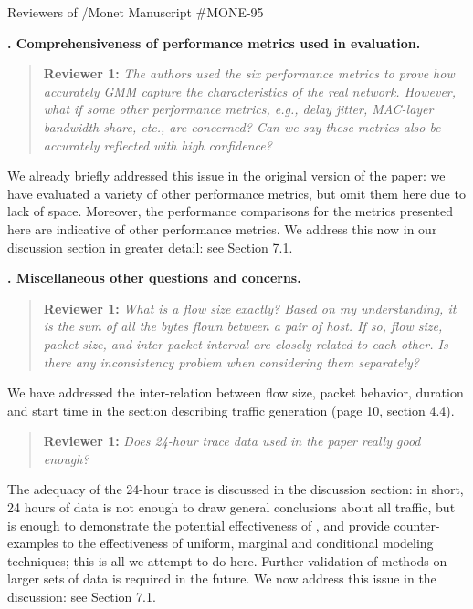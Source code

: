 \documentclass{letter}
\newcounter{topic}
\newcommand{\topic}[1]{
\addtocounter{topic}{1}
\textbf{\arabic{topic}. #1}
}
\newenvironment{reviewer}[1]%
{\begin{quote}\textbf{Reviewer #1:} \it}{\end{quote}}
\begin{document}
\begin{letter}{Reviewers of /Monet Manuscript \#MONE-95}
\topic{Comprehensiveness of performance metrics used in evaluation.}

\begin{reviewer}{1}
The authors used the six performance metrics to prove how accurately GMM capture the characteristics of the real network. However, what if some other performance metrics, e.g., delay jitter, MAC-layer bandwidth share, etc., are concerned? Can we say these metrics also be accurately reflected with high confidence?
\end{reviewer}

We already briefly addressed this issue in the original version of the paper:
we have evaluated a variety of other performance metrics, but omit them here due to lack of space.
Moreover, the performance comparisons for the metrics presented here are indicative of other performance metrics.
We address this now in our discussion section in greater detail: see Section 7.1.

\topic{Miscellaneous other questions and concerns.}

\begin{reviewer}{1}
What is a flow size exactly? Based on my understanding, it is the sum of all the bytes ﬂown between a pair of host. If so, flow size, packet size, and inter-packet interval are closely related to each other. Is there any inconsistency problem when considering them separately?
\end{reviewer}
We have addressed the inter-relation between flow size, packet behavior, duration and start time in the section describing traffic generation (page 10, section 4.4).

\begin{reviewer}{1}
Does 24-hour trace data used in the paper really good enough?
\end{reviewer}
The adequacy of the 24-hour trace is discussed in the discussion section: in short, 24 hours of data is not enough to draw general conclusions about all traffic, but is enough to demonstrate the potential effectiveness of , and provide counter-examples to the effectiveness of uniform, marginal and conditional modeling techniques;
this is all we attempt to do here.
Further validation of methods on larger sets of data is required in the future.
We now address this issue in the discussion: see Section 7.1.


\end{letter}
\end{document}
